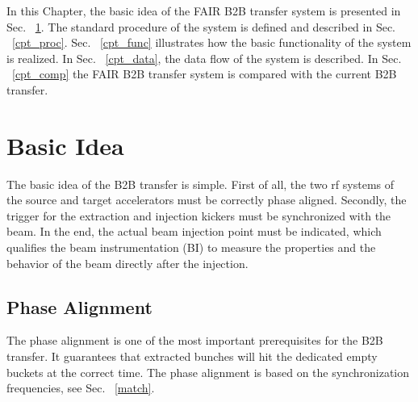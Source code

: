 

In this Chapter, the basic idea of the FAIR B2B transfer system is presented in Sec. ~\ref{cpt_idea}. The standard procedure of the system is defined and described in Sec. ~\ref{cpt_proc}. Sec.  ~\ref{cpt_func} illustrates how the basic functionality of the system is realized. In Sec.  ~\ref{cpt_data}, the data flow of the system is described. In Sec.  ~\ref{cpt_comp} the FAIR B2B transfer system is compared with the current B2B transfer. 

\section{Basic Idea} 
\label{cpt_idea}
The basic idea of the B2B transfer is simple. First of all, the two rf systems of the source and target accelerators must be correctly phase aligned. Secondly, the trigger for the extraction and injection kickers must be synchronized with the beam. In the end, the actual beam injection point must be indicated, which qualifies the beam instrumentation (\gls{BI}) to measure the properties and the behavior of the beam directly after the injection. 



\subsection{Phase Alignment}
The phase alignment is one of the most important prerequisites for the B2B transfer. It guarantees that extracted bunches will hit the dedicated empty buckets at the correct time. The phase alignment is based on the synchronization frequencies, see Sec. ~\ref{match}. 

